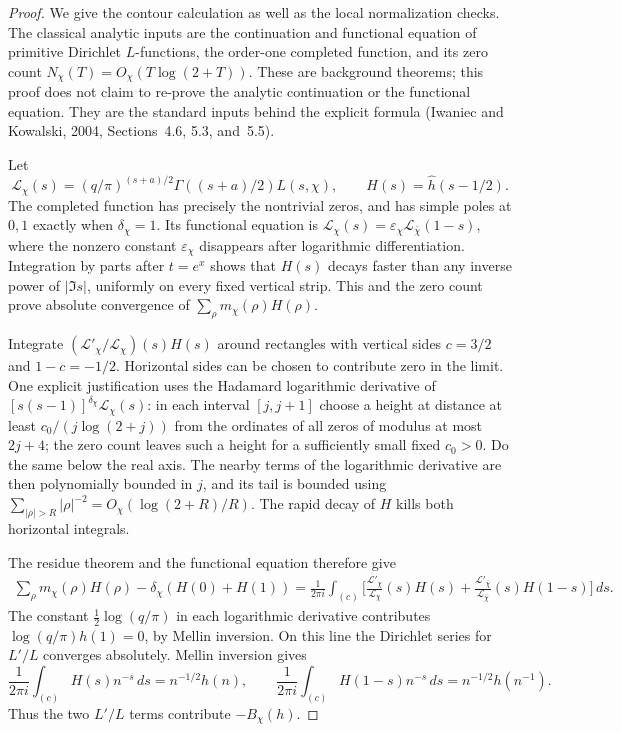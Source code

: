 \documentclass[11pt,a4paper]{article}
\theoremstyle{definition}\newtheorem{definition}[theorem]{Definition}
\theoremstyle{remark}\newtheorem{remark}[theorem]{Remark}
\begin{document}
\begin{proof}
We give the contour calculation as well as the local normalization checks.
The classical analytic inputs are the continuation and functional equation
of primitive Dirichlet $L$-functions, the order-one completed function,
and its zero count $N_\chi(T)=O_\chi(T\log(2+T))$.  These are background
theorems; this proof does not claim to re-prove the analytic continuation
or the functional equation.  They are the standard inputs behind the
explicit formula (Iwaniec and Kowalski, 2004, Sections~4.6, 5.3, and~5.5).

Let
\[
 \mathcal L_\chi(s)=(q/\pi)^{(s+a)/2}
            \Gamma((s+a)/2)L(s,\chi),\qquad H(s)=\widehat h(s-1/2).
\]
The completed function has precisely the nontrivial zeros, and has simple
poles at $0,1$ exactly when $\delta_\chi=1$.  Its functional equation is
$\mathcal L_\chi(s)=\varepsilon_\chi\mathcal L_{\bar\chi}(1-s)$,
where the nonzero constant $\varepsilon_\chi$ disappears after logarithmic
differentiation.  Integration by parts after $t=e^x$ shows that $H(s)$
decays faster than any inverse power of $|\Im s|$, uniformly on every
fixed vertical strip.  This and the zero count prove absolute convergence
of $\sum_\rho m_\chi(\rho)H(\rho)$.

Integrate $(\mathcal L'_\chi/\mathcal L_\chi)(s)H(s)$ around rectangles
with vertical sides $c=3/2$ and $1-c=-1/2$.  Horizontal sides can be chosen
to contribute zero in the limit.  One explicit justification uses the
Hadamard logarithmic derivative of
$[s(s-1)]^{\delta_\chi}\mathcal L_\chi(s)$: in each interval $[j,j+1]$
choose a height at distance at least $c_0/(j\log(2+j))$ from the ordinates
of all zeros of modulus at most $2j+4$; the zero count leaves such a height
for a sufficiently small fixed $c_0>0$.  Do the same below the real axis.
The nearby terms of the logarithmic derivative are then polynomially
bounded in $j$, and its tail is bounded using
$\sum_{|\rho|>R}|\rho|^{-2}=O_\chi(\log(2+R)/R)$.
The rapid decay of $H$ kills both horizontal integrals.

The residue theorem and the functional equation therefore give
\begin{align*}
 \sum_\rho m_\chi(\rho)H(\rho)-\delta_\chi(H(0)+H(1))
 =\frac1{2\pi i}\int_{(c)}\biggl[
 \frac{\mathcal L'_\chi}{\mathcal L_\chi}(s)H(s)
 +\frac{\mathcal L'_{\bar\chi}}{\mathcal L_{\bar\chi}}(s)H(1-s)
 \biggr]\,ds.
\end{align*}
The constant $\tfrac12\log(q/\pi)$ in each logarithmic derivative
contributes $\log(q/\pi)h(1)=0$, by Mellin inversion.  On this line the
Dirichlet series for $L'/L$ converges absolutely.  Mellin inversion gives
\[
 \frac1{2\pi i}\int_{(c)}H(s)n^{-s}\,ds=n^{-1/2}h(n),\qquad
 \frac1{2\pi i}\int_{(c)}H(1-s)n^{-s}\,ds=n^{-1/2}h(n^{-1}).
\]
Thus the two $L'/L$ terms contribute $-B_\chi(h)$.


\end{proof}
\end{document}
